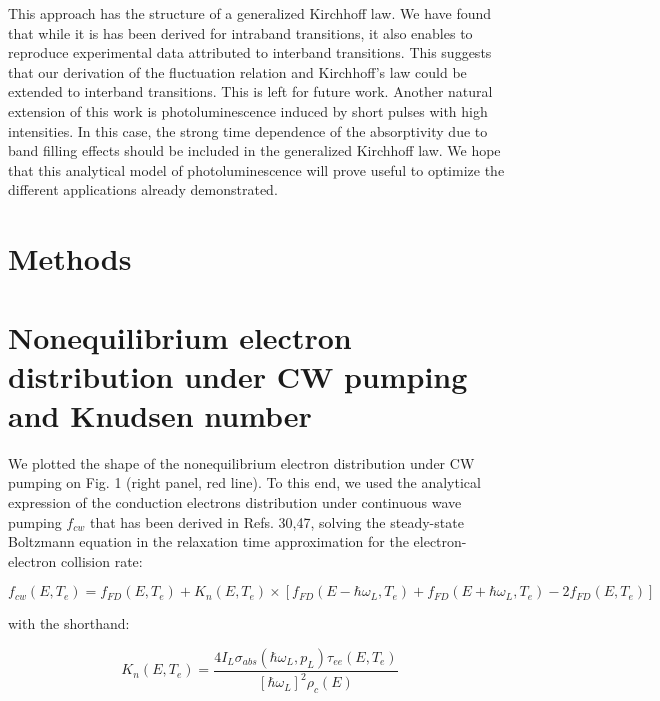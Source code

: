 \documentclass[10pt]{article}
\begin{document}
This approach has the structure of a generalized Kirchhoff law. We have found that while it is has been derived for intraband transitions, it also enables to reproduce experimental data attributed to interband transitions. This suggests that our derivation of the fluctuation relation and Kirchhoff's law could be extended to interband transitions. This is left for future work. Another natural extension of this work is photoluminescence induced by short pulses with high intensities. In this case, the strong time dependence of the absorptivity due to band filling effects should be included in the generalized Kirchhoff law. We hope\\
that this analytical model of photoluminescence will prove useful to optimize the different applications already demonstrated.

\section*{Methods}
\section*{Nonequilibrium electron distribution under CW pumping and Knudsen number}
We plotted the shape of the nonequilibrium electron distribution under CW pumping on Fig. 1 (right panel, red line). To this end, we used the analytical expression of the conduction electrons distribution under continuous wave pumping $f_{c w}$ that has been derived in Refs. 30,47, solving the steady-state Boltzmann equation in the relaxation time approximation for the electron-electron collision rate:


\begin{equation*}
f_{c w}\left(E, T_{e}\right)=f_{F D}\left(E, T_{e}\right)+K_{n}\left(E, T_{e}\right) \times\left[f_{F D}\left(E-\hbar \omega_{L}, T_{e}\right)+f_{F D}\left(E+\hbar \omega_{L}, T_{e}\right)-2 f_{F D}\left(E, T_{e}\right)\right] \tag{12}
\end{equation*}


with the shorthand:


\begin{equation*}
K_{n}\left(E, T_{e}\right)=\frac{4 I_{L} \sigma_{a b s}\left(\hbar \omega_{L}, p_{L}\right) \tau_{e e}\left(E, T_{e}\right)}{\left[\hbar \omega_{L}\right]^{2} \rho_{c}(E)} \tag{13}
\end{equation*}
\end{document}
